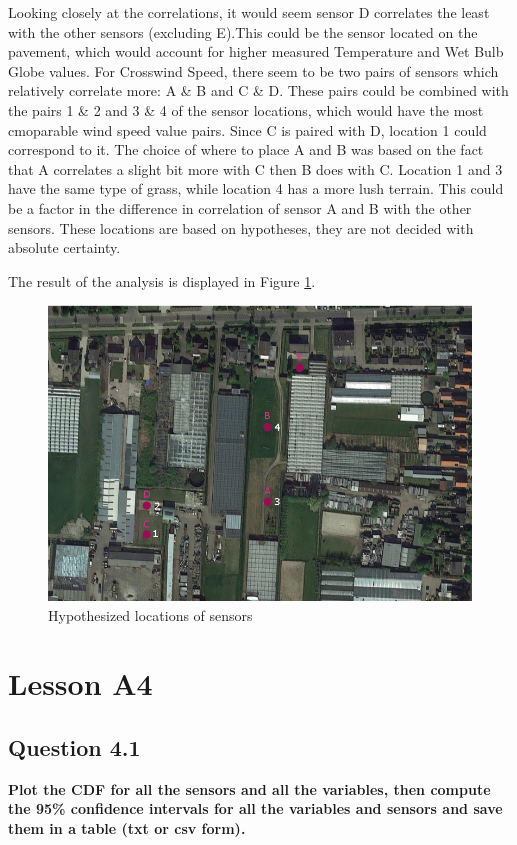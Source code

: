\documentclass{report}
\begin{document}
	Looking closely at the correlations, it would seem sensor D correlates the least with the other sensors (excluding E).This could be the sensor located on the pavement, which would account for higher measured Temperature and Wet Bulb Globe values. For Crosswind Speed, there seem to be two pairs of sensors which relatively correlate more: A \& B and C \& D. These pairs could be combined with the pairs 1 \& 2 and 3 \& 4 of the sensor locations, which would have the most cmoparable wind speed value pairs. Since C is paired with D, location 1 could correspond to it. The choice of where to place A and B was based on the fact that A correlates a slight bit more with C then B does with C. Location 1 and 3 have the same type of grass, while location 4 has a more lush terrain. This could be a factor in the difference in correlation of sensor A and B with the other sensors. These locations are based on hypotheses, they are not decided with absolute certainty.
	
	The result of the analysis is displayed in Figure \ref{fig:locations}.
	
	\begin{figure}[H]
		\includegraphics[width=\linewidth]{GEO1001_hw01_images/SensorsSketch_guess.png}
		\caption{Hypothesized locations of sensors}
		\label{fig:locations}
	\end{figure}
	
	
	\section{Lesson A4}
	
	\subsection{Question 4.1}
	\textbf{Plot the CDF for all the sensors and all the variables, then compute the 95\% confidence intervals for all the variables and sensors and save them in a table (txt or csv form).}
	
\end{document}
